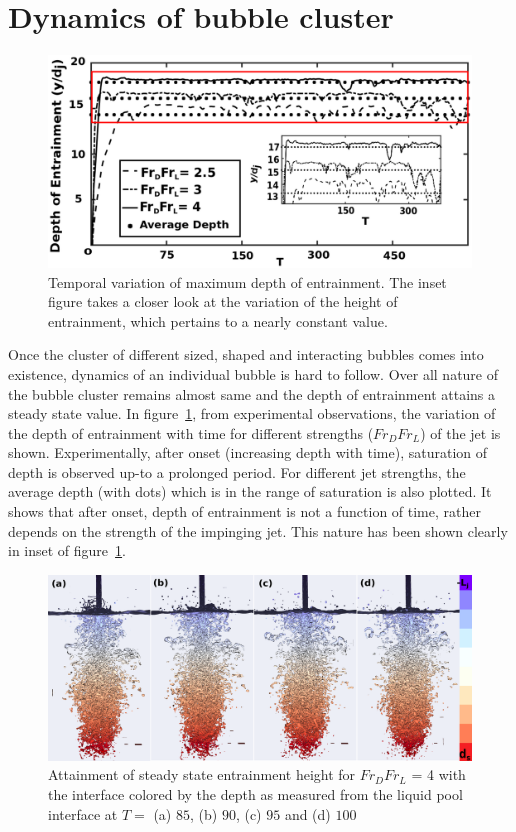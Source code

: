 \section{Dynamics of bubble cluster}
\begin{figure}
	\centering
	\includegraphics[width=\linewidth]{chapters/jetPool/Figure12}
	\caption{Temporal variation of maximum depth of entrainment. The inset figure takes a closer look at the variation of the height of entrainment, which pertains to a nearly constant value.}
	\label{Figure::TemporalHeight}		
\end{figure}
Once the cluster of different sized, shaped and interacting bubbles comes into existence, dynamics of an individual bubble is hard to follow. Over all nature of the bubble cluster remains almost same and the depth of entrainment attains a steady state value. In figure~\ref{Figure::TemporalHeight}, from experimental observations, the variation of the depth of entrainment with time for different strengths ($Fr_DFr_L$) of the jet is shown. Experimentally, after onset (increasing depth with time), saturation of depth is observed up-to a prolonged period. For different jet strengths, the average depth (with dots) which is in the range of saturation is also plotted. It shows that after onset, depth of entrainment is not a function of time, rather depends on the strength of the impinging jet. This nature has been shown clearly in inset of figure~\ref{Figure::TemporalHeight}. \\
\begin{figure}
	\centering
	\includegraphics[width=\linewidth]{chapters/jetPool/Figure13}
	\caption{Attainment of steady state entrainment height for $Fr_DFr_L$ = 4 with the interface colored by the depth as measured from the liquid pool interface at $T =$  (a) $85$, (b) $90$, (c) $95$ and (d) $100$}
	\label{Figure::hsteady}		
\end{figure}
